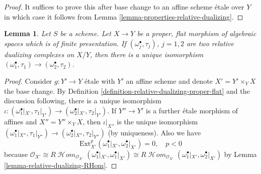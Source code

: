 \documentclass{stacks-project}
\theoremstyle{plain}
\newtheorem{lemma}[subsection]{Lemma}
\theoremstyle{definition}
\theoremstyle{remark}
\numberwithin{equation}{subsection}
\def\SheafHom{\mathop{\mathcal{H}\!\mathit{om}}\nolimits}
\begin{document}
\begin{proof}
It suffices to prove this after base change to an affine scheme \'etale
over $Y$ in which case it follows from
Lemma \ref{lemma-properties-relative-dualizing}.
\end{proof}

\begin{lemma}
\label{lemma-uniqueness-relative-dualizing}
Let $S$ be a scheme. Let $X \to Y$ be a proper, flat morphism of
algebraic spaces which is of finite presentation.
If $(\omega_j^\bullet, \tau_j)$, $j = 1, 2$
are two relative dualizing complexes on $X/Y$,
then there is a unique isomorphism
$(\omega_1^\bullet, \tau_1) \to (\omega_2^\bullet, \tau_2)$.
\end{lemma}

\begin{proof}
Consider $g : Y' \to Y$ \'etale with $Y'$ an affine scheme
and denote $X' = Y' \times_Y X$ the base change.
By Definition \ref{definition-relative-dualizing-proper-flat}
and the discussion following, there is a unique isomorphism
$\iota : (\omega_1^\bullet|_{X'}, \tau_1|_{Y'}) \to
(\omega_2^\bullet|_{X'}, \tau_2|_{Y'})$. If $Y'' \to Y'$
is a further \'etale morphism of affines and $X'' = Y'' \times_Y X$,
then $\iota|_{X''}$ is the unique isomorphism
$(\omega_1^\bullet|_{X''}, \tau_1|_{Y''}) \to
(\omega_2^\bullet|_{X''}, \tau_2|_{Y''})$ (by uniqueness).
Also we have
$$
\text{Ext}^p_{X'}(\omega_1^\bullet|_{X'}, \omega_2^\bullet|_{X'}) = 0,
\quad p < 0
$$
because
$\mathcal{O}_{X'} \cong
R\SheafHom_{\mathcal{O}_{X'}}(\omega_1^\bullet|_{X'}, \omega_1^\bullet|_{X'})
\cong
R\SheafHom_{\mathcal{O}_{X'}}(\omega_1^\bullet|_{X'}, \omega_2^\bullet|_{X'})$
by Lemma \ref{lemma-relative-dualizing-RHom}.


\end{proof}
\end{document}
